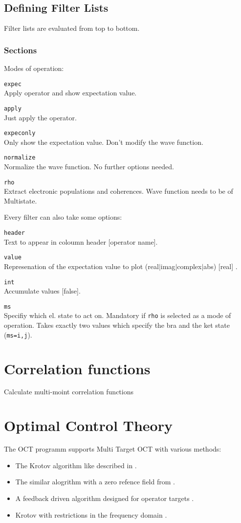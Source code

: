 \documentclass[a4paper,12pt]{scrbook}
\newcommand{\option}[2]{\item \texttt{#1}\\ #2}
\newcommand{\code}[1]{\texttt{#1}}
\begin{document}
\subsection{Defining Filter Lists}
\label{sec:Filters}
Filter lists are evaluated from top to bottom.

\subsubsection*{Sections}
Modes of operation:
\begin{options}
\option{expec}{Apply operator and show expectation value.}
\option{apply}{Just apply the operator.}
\option{expeconly}{Only show the expectation value. Don't modify the wave function.}
\option{normalize}{Normalize the wave function. No further options needed.}
\option{rho}{Extract electronic populations and coherences. Wave function needs to be of Multistate.}
\end{options}

Every filter can also take some options:
\begin{options}
\option{header}{Text to appear in coloumn header [operator name].}
\option{value}{Represenation of the expectation value to plot (real$|$imag$|$complex$|$abs) [real] .}
\option{int}{Accumulate values [false].}
\option{ms}{Specifiy which el. state to act on. Mandatory if \code{rho} is selected as a 
mode of operation. Takes exactly two values which specify the bra and the ket state (\code{ms=i,j}).}
\end{options}


\section{Correlation functions}
Calculate multi-moint correlation functions

\section{Optimal Control Theory}
The OCT programm supports Multi Target OCT with various methods:
\begin{itemize}
 \item The Krotov algorithm like described in \cite{Palao03}.
 \item The similar alogrithm with a zero refence field from \cite{Zhu98}.
 \item A feedback driven algorithm designed for operator targets \cite{Zhu98FB}.
 \item Krotov with restrictions in the frequency domain \cite{Gollub08,Gollub10}.
\end{itemize}
\end{document}

